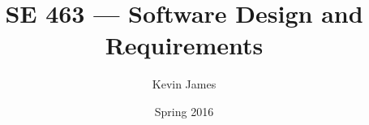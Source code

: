 \documentclass[12pt]{article}
\begin{document}
\title{SE 463 --- Software Design and Requirements}
\author{Kevin James}
\date{\vspace{-2ex}Spring 2016}
\maketitle\HRule

\tableofcontents
\newpage

\section{}
\end{document}
